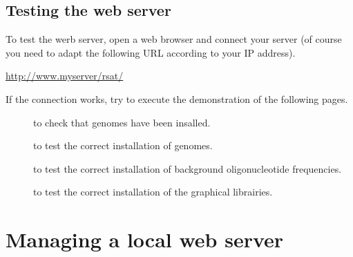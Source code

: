 \documentclass[12pt,a4paper, twoside]{scrreprt} %
\begin{document}





\subsection{Testing the web server}

To test the werb server, open a web browser and connect your \RSAT
server (of course you need to adapt the following URL according to
your IP address).

\url{http://www.myserver/rsat/} 

If the connection works, try to execute the demonstration of the
following pages.

\begin{description}
\item[] to check that genomes have
  been insalled.
  
\item[] to test the correct installation of
  genomes.

\item[] to test the correct installation of
  background oligonucleotide frequencies.

\item[] to test the correct installation of the
  graphical librairies.
\end{description}

\section{Managing a local web server}
\end{document}
